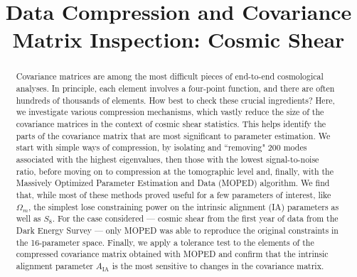 \documentclass[twocolumn]{\docclass}
\begin{document}
	
	\title{Data Compression and Covariance Matrix Inspection: Cosmic Shear}
	\maketitlepre
	
	\begin{abstract}
		Covariance matrices are among the most difficult pieces of end-to-end cosmological analyses. In principle, each element involves a four-point function, and there are often hundreds of thousands of elements. How best to check these crucial ingredients? Here, we investigate various compression mechanisms, which vastly reduce the size of the covariance matrices in the context of cosmic shear statistics. 
		This helps identify the parts of the covariance matrix that are most significant to parameter estimation. We start with simple ways of compression, by isolating and ``removing" 200 modes associated with the highest eigenvalues, then those with the lowest signal-to-noise ratio, before moving on to compression at the tomographic level and, finally, with the Massively Optimized Parameter Estimation and Data (MOPED) algorithm. We find that, while most of these methods proved useful for a few parameters of interest, like $\Omega_m$, the simplest lose constraining power on the intrinsic alignment (IA) parameters as well as $S_8$. %
		For the case considered --- cosmic shear from the first year of data from the Dark Energy Survey --- only MOPED was able to reproduce the original constraints in the 16-parameter space. Finally, we apply a tolerance test to the elements of the compressed covariance matrix obtained with MOPED and confirm that the intrinsic alignment parameter $A_{\mathrm{IA}}$ is the most sensitive to changes in the covariance matrix.
		

\end{abstract}
\end{document}
